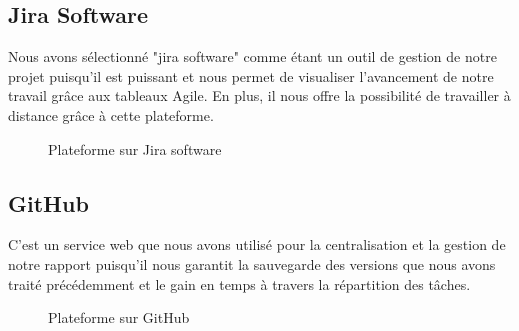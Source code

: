 	\subsection{Jira Software}
	Nous avons sélectionné "jira software" comme étant un outil de gestion de notre projet puisqu'il est  puissant et nous permet de visualiser l'avancement de notre travail grâce aux tableaux Agile. En plus, il nous offre la possibilité de travailler à distance grâce à cette plateforme.
	\begin{figure}[h]
		\begin{center}
			\centering
		\end{center}
		\caption{Plateforme sur Jira software}
	\end{figure}
	\subsection{GitHub}
	C'est un service web que nous avons utilisé pour la centralisation et la gestion de notre rapport puisqu'il nous garantit la sauvegarde des versions  que nous avons traité précédemment et le gain en temps à travers la répartition des tâches.  
	
	\begin{figure}[H]
		\begin{center}
			\centering
		\end{center}
		\caption{Plateforme sur GitHub}
	\end{figure}
